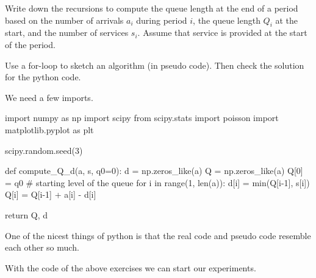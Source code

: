 \begin{exercise}
Write down the recursions to compute the queue length at the end of a period based on the number of arrivals $a_i$ during  period $i$, the queue length $Q_i$ at the start, and the number of services $s_i$. Assume that service is provided at the start of the period.  

Use a for-loop to sketch an algorithm (in pseudo code). Then check the solution for the python code.

  \begin{solution}
    We need a few imports.
\begin{pyblock}
import numpy as np
import scipy
from scipy.stats import poisson
import matplotlib.pyplot as plt

scipy.random.seed(3) 


def compute_Q_d(a, s, q0=0):
    d = np.zeros_like(a)
    Q = np.zeros_like(a)
    Q[0] = q0 # starting level of the queue
    for i in range(1, len(a)):
        d[i] = min(Q[i-1], s[i])
        Q[i] = Q[i-1] + a[i] - d[i]

    return Q, d
  
\end{pyblock}

    One of the nicest things of python is that  the real code and pseudo code resemble each other so much.
  \end{solution}
  
\end{exercise}


With the code of the above exercises we can start our experiments.

